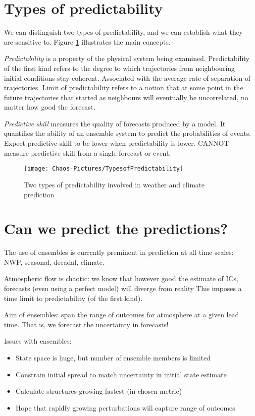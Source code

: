 \section{Types of predictability}
We can distinguish two types of predictability, and we can establish what they are sensitive to. Figure \ref{Fig:TypesofPredictability} illustrates the main concepts. 

\emph{Predictability} is a property of the physical system being examined.
Predictability of the first kind refers to the degree to which trajectories from neighbouring initial conditions stay coherent.    
Associated with the average rate of separation of trajectories.
Limit of predictability refers to a notion that at some point in the future trajectories that started as neighbours will eventually be uncorrelated,   no matter how good the forecast.

\emph{Predictive skill} measures the quality of forecasts produced by a model. 
It quantifies the ability of an ensemble system to predict the probabilities of events.
Expect predictive skill to be lower when predictability is lower.
CANNOT measure predictive skill from a single forecast or event.

\begin{figure}[h!]
\texttt{[image: Chaos-Pictures/TypesofPredictability]}
\caption{Two types of predictability involved in weather and climate prediction}
\label{Fig:TypesofPredictability}
\end{figure}

		
\section{Can we predict the predictions?}
The use of ensembles is currently preminent in prediction at all time scales: NWP, seasonal, decadal, climate.

Atmospheric flow is chaotic: we know that however good the estimate of ICs, forecasts (even using a perfect model) will diverge from reality
This imposes a time limit to predictability (of the first kind).

Aim of ensembles: span the range of outcomes for atmosphere at a given lead time. That is, we forecast the uncertainty in forecasts!

Issues with ensembles:
\begin{itemize}
\item State space is huge, but number of ensemble members is limited
\item Constrain initial spread to match uncertainty in initial state estimate
\item Calculate structures growing fastest (in chosen metric)
\item Hope that rapidly growing perturbations will capture range of outcomes
\end{itemize}

